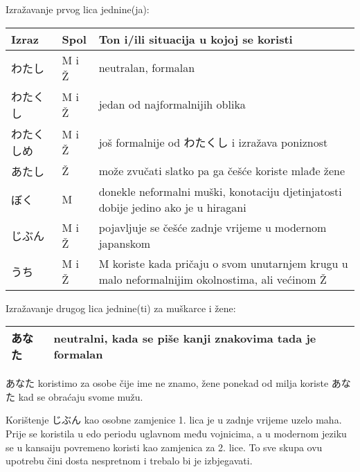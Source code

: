 
\author{Tomislav Mamić, Željka Ludošan}
\usepackage{graphicx}
\usepackage{caption}


	
		
	Izražavanje prvog lica jednine(ja):
	\begin{table}[!h]	
	\begin{tabular}{l l p{400pt}}
		\toprule[2pt]
		Izraz		&Spol	& Ton i/ili situacija u kojoj se koristi\\
		\midrule
		わたし		&M i Ž	&neutralan, formalan\\
		わたくし	&M i Ž	&jedan od najformalnijih oblika\\
		わたくしめ	&M i Ž	&još formalnije od わたくし i izražava poniznost\\
		あたし		&Ž	&može zvučati slatko pa ga češće koriste mlađe žene\\
		ぼく		&M	&donekle neformalni muški, konotaciju djetinjatosti dobije jedino ako je u hiragani\\
		じぶん		&M i Ž	&pojavljuje se češće zadnje vrijeme u modernom japanskom\\
		うち		&M i Ž	&M koriste kada pričaju o svom unutarnjem krugu u malo neformalnijim okolnostima, ali većinom Ž\\
		\bottomrule[2pt]
	\end{tabular}
	\end{table}

	
	Izražavanje drugog lica jednine(ti) za muškarce i žene:
	\begin{table}[!h]
	\begin{tabular}{l l}
		\toprule[2pt]
		あなた&neutralni, kada se piše kanji znakovima tada je formalan\\
		\bottomrule[2pt]
	\end{tabular}
	\end{table}
		
	あなた koristimo za osobe čije ime ne znamo, žene ponekad od milja koriste あなた kad se obraćaju svome mužu.
	
	Korištenje じぶん kao osobne zamjenice 1. lica je u zadnje vrijeme uzelo maha. Prije se koristila u edo periodu uglavnom među vojnicima, a u modernom jeziku se u kansaiju povremeno koristi kao zamjenica za 2. lice. To sve skupa ovu upotrebu čini dosta nespretnom i trebalo bi je izbjegavati.
	
